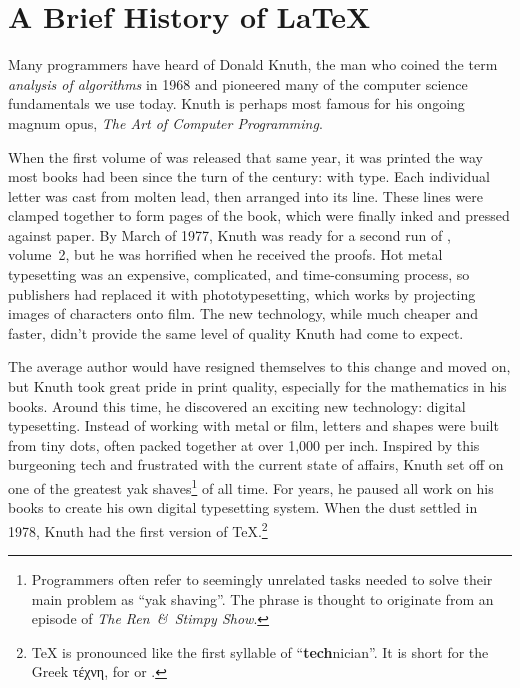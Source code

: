 \chapter{A Brief History of \texorpdfstring{\LaTeX}{LaTeX}}
\label{history}

Many programmers have heard of Donald Knuth,
the man who coined the term \emph{analysis of algorithms} in 1968
and pioneered many of the computer science fundamentals we use today.
Knuth is perhaps most famous for his ongoing magnum opus,
\textit{The Art of Computer Programming}.

When the first volume of  was released that same year,
it was printed the way most books had been since the turn of the century:
with  type.
Each individual letter was cast from molten lead,
then arranged into its line.
These lines were clamped together to form pages of the book,
which were finally inked and pressed against paper.
By March of 1977, Knuth was ready for a second run of , volume~2,
but he was horrified when he received the proofs.
Hot metal typesetting was an expensive, complicated, and time-consuming process,
so publishers had replaced it with phototypesetting,
which works by projecting images of characters onto film.
The new technology, while much cheaper and faster,
didn't provide the same level of quality Knuth had come to
expect.\punckern{}

The average author would have resigned themselves to this change and moved on,
but Knuth took great pride in print quality,
especially for the mathematics in his books.
Around this time, he discovered an exciting new technology:
digital typesetting.
Instead of working with metal or film,
letters and shapes were built from tiny dots,
often packed together at over 1,000 per inch.
Inspired by this burgeoning tech and frustrated with the current state of affairs,
Knuth set off on one of the greatest yak shaves\footnote{Programmers
often refer to seemingly unrelated tasks needed to solve their main problem
as ``yak shaving''\quotekern. The phrase is thought to originate from an episode
of \textit{The Ren~\&~Stimpy Show}.}
of all time.
For years, he paused all work on his books to create his own
digital typesetting system.
When the dust settled in 1978, Knuth had the first version of
\TeX.\punckern\footnote{\TeX{} is pronounced like the first syllable of
``\textbf{tech}nician''\quotekern. It is short for the Greek
{τέχνη},
for  or .}

